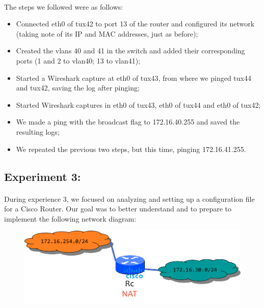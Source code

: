 \documentclass[11pt]{article}
\begin{document}
\paragraph{}The steps we followed were as follows:

\begin{itemize}
    \item Connected eth0 of tux42 to port 13 of the router and configured its network (taking note of its IP and MAC addresses, just as before);
    \item Created the vlans 40 and 41 in the switch and added their corresponding ports (1 and 2 to vlan40; 13 to vlan41);
    \item Started a Wireshark capture at eth0 of tux43, from where we pinged tux44 and tux42, saving the log after pinging;
    \item Started Wireshark captures in eth0 of tux43, eth0 of tux44 and eth0 of tux42;
    \item We made a ping with the broadcast flag to 172.16.40.255 and saved the resulting logs;
    \item We repeated the previous two steps, but this time, pinging 172.16.41.255.
\end{itemize}

\subsection*{Experiment 3:}

\paragraph{}During experience 3, we focused on analyzing and setting up a configuration file for a Cisco Router. Our goal was to better understand and to prepare to implement the following network diagram:

\begin{figure}[h]
\includegraphics[scale=1]{images/net-exp3.png}
\centering
\end{figure}
\end{document}
